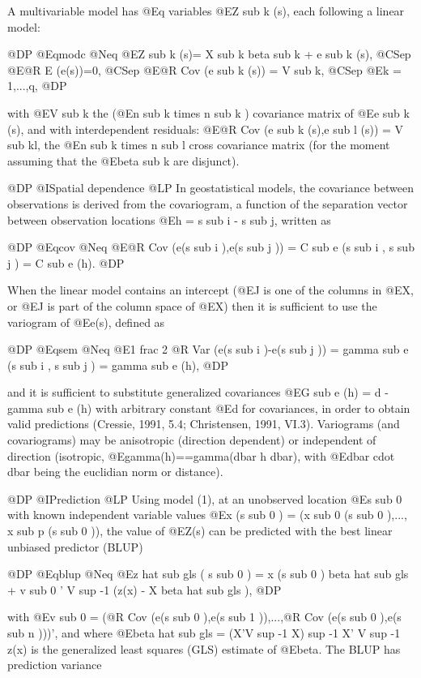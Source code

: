 \documentclass{article}
\begin{document}
A multivariable model has @E{q} variables @E{Z sub k (s)}, each
following a linear model:

@DP
@Eqmodc @Neq { @E{Z sub k (s)= X sub k beta sub k + e sub k (s)}, @CSep
@E{@R E (e(s))=0}, @CSep @E{@R Cov (e sub k (s)) = V sub k}, @CSep
@E{k = 1,...,q},}
@DP

with @E{V sub k} the (@E{n sub k times n sub k }) covariance matrix of
@E{e sub k (s)}, and with interdependent residuals: @E{@R Cov (e sub
k (s),e sub l (s)) = V sub kl}, the @E{n sub k times n sub l} cross
covariance matrix (for the moment assuming that the @E{beta sub k} are
disjunct).

@DP
@I{Spatial dependence}
@LP
In geostatistical models, the covariance between observations is derived
from the covariogram, a function of the separation vector between
observation locations @E{h = s sub i - s sub j}, written as

@DP
@Eqcov @Neq {@E{@R Cov (e(s sub i ),e(s sub j )) = C sub e (s sub i , s
sub j ) = C sub e (h)}.}
@DP

When the linear model contains an intercept (@E{J} is one of the
columns in @E{X}, or @E{J} is part of the column space of @E{X}) then
it is sufficient to use the variogram of @E{e(s)}, defined as

@DP
@Eqsem @Neq {@E{1 frac 2 @R Var (e(s sub i )-e(s sub j )) = gamma sub e
(s sub i , s sub j ) = gamma sub e (h)},}
@DP

and it is sufficient to substitute generalized covariances @E{G sub e
(h) = d - gamma sub e (h)} with arbitrary constant @E{d} for
covariances, in order to obtain valid predictions (Cressie, 1991, 5.4;
Christensen, 1991, VI.3).  Variograms (and covariograms) may be
anisotropic (direction dependent) or independent of direction
(isotropic, @E{gamma(h)==gamma(dbar h dbar)}, with @E{dbar cdot dbar}
being the euclidian norm or distance).

@DP
@I{Prediction}
@LP
Using model (1), at an unobserved location @E{s sub 0} with known
independent variable values @E{x (s sub 0 ) = (x sub 0 (s sub 0 ),..., x
sub p (s sub 0 ))}, the value of @E{Z(s)} can be predicted with the
best linear unbiased predictor (BLUP)

@DP
@Eqblup @Neq {@E{z hat sub gls ( s sub 0 ) = x (s sub 0 ) beta hat sub
gls + v sub 0 ' V sup -1 (z(x) - X beta hat sub gls ), }}
@DP

with
@E{v sub 0 = (@R Cov (e(s sub 0 ),e(s sub 1 )),...,@R Cov (e(s sub 0
),e(s sub n )))'}, and where @E{beta hat sub gls = (X'V sup -1 X) sup -1
X' V sup -1 z(x)} is the generalized least squares (GLS) estimate of
@E{beta}. The BLUP has prediction variance
\end{document}
